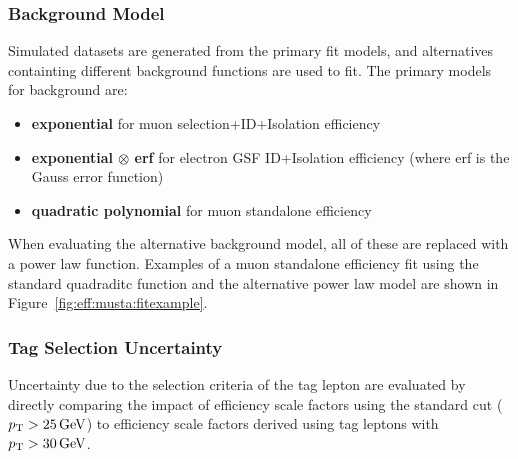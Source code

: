 \subsubsection{Background Model}\label{ch:eff:bkg}
Simulated datasets are generated from the primary fit models, and alternatives containting different background functions are used to fit. The primary models for background are: 
\begin{itemize}
\item \textbf{exponential} for muon selection+ID+Isolation efficiency
\item \textbf{exponential $\otimes$ erf} for electron GSF ID+Isolation efficiency (where erf is the Gauss error function)
\item \textbf{quadratic polynomial} for muon standalone efficiency
\end{itemize}
When evaluating the alternative background model, all of these are replaced with a power law function. Examples of a muon standalone efficiency fit using the standard quadraditc function and the alternative power law model are shown in Figure~\ref{fig:eff:musta:fitexample}. 


\subsubsection{Tag Selection Uncertainty}
Uncertainty due to the selection criteria of the tag lepton are evaluated by directly comparing the impact of efficiency scale factors using the standard cut ($p_{\mathrm{T}} > 25 \,\text{Ge\hspace{-.08em}V}$) to efficiency scale factors derived using tag leptons with $p_{\mathrm{T}} > 30\,\text{Ge\hspace{-.08em}V}$.


